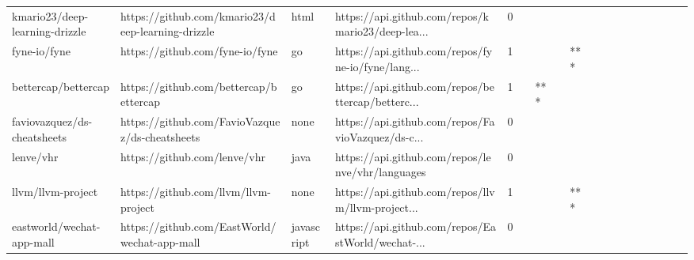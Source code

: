 \begin{tabular}{llllrlllllllllllll}
kmario23/deep-learning-drizzle                     &  https://github.com/kmario23/deep-learning-drizzle &              html &  https://api.github.com/repos/kmario23/deep-lea... &       0 &         &        &           &                &                 &        &           &           &          &          &       &              &          \\
fyne-io/fyne                                       &                    https://github.com/fyne-io/fyne &                go &  https://api.github.com/repos/fyne-io/fyne/lang... &       1 &         &        &           &            *** &                 &        &           &           &          &          &       &              &          \\
bettercap/bettercap                                &             https://github.com/bettercap/bettercap &                go &  https://api.github.com/repos/bettercap/betterc... &       1 &         &    *** &           &                &                 &        &           &           &          &          &       &              &          \\
faviovazquez/ds-cheatsheets                        &     https://github.com/FavioVazquez/ds-cheatsheets &              none &  https://api.github.com/repos/FavioVazquez/ds-c... &       0 &         &        &           &                &                 &        &           &           &          &          &       &              &          \\
lenve/vhr                                          &                       https://github.com/lenve/vhr &              java &   https://api.github.com/repos/lenve/vhr/languages &       0 &         &        &           &                &                 &        &           &           &          &          &       &              &          \\
llvm/llvm-project                                  &               https://github.com/llvm/llvm-project &              none &  https://api.github.com/repos/llvm/llvm-project... &       1 &         &        &           &            *** &                 &        &           &           &          &          &       &              &          \\
eastworld/wechat-app-mall                          &       https://github.com/EastWorld/wechat-app-mall &        javascript &  https://api.github.com/repos/EastWorld/wechat-... &       0 &         &        &           &                &                 &        &           &           &          &          &       &              &          \\

\end{tabular}
